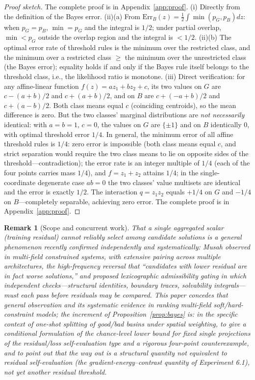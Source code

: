 \documentclass[11pt]{article}
\newtheorem*{remark}{Remark}
\numberwithin{equation}{section}
\begin{document}
\begin{proof}[Proof sketch] The complete proof is in Appendix~\ref{app:proof}.
(i) Directly from the definition of the Bayes error. (ii)(a) From $\mathrm{Err}_B(z)=\tfrac12\int\min(p_G,p_B)dz$: when $p_G=p_B$, $\min=p_G$ and the integral is $1/2$; under partial overlap, $\min<p_G$ outside the overlap region and the integral is $<1/2$. (ii)(b) The optimal error rate of threshold rules is the minimum over the restricted class, and the minimum over a restricted class $\ge$ the minimum over the unrestricted class (the Bayes error); equality holds if and only if the Bayes rule itself belongs to the threshold class, i.e., the likelihood ratio is monotone. (iii) Direct verification: for any affine-linear function $f(z)=az_1+bz_2+c$, its two values on $G$ are $c-(a+b)/2$ and $c+(a+b)/2$, and on $B$ are $c+(-a+b)/2$ and $c+(a-b)/2$. Both class means equal $c$ (coinciding centroids), so the mean difference is zero. But the two classes' marginal distributions are \emph{not necessarily} identical: with $a=b=1$, $c=0$, the values on $G$ are $\{\pm1\}$ and on $B$ identically $0$, with optimal threshold error $1/4$. In general, the minimum error of all affine threshold rules is $1/4$: zero error is impossible (both class means equal $c$, and strict separation would require the two class means to lie on opposite sides of the threshold---contradiction); the error rate is an integer multiple of $1/4$ (each of the four points carries mass $1/4$), and $f=z_1+z_2$ attains $1/4$; in the single-coordinate degenerate case $ab=0$ the two classes' value multisets are identical and the error is exactly $1/2$. The interaction $q=z_1z_2$ equals $+1/4$ on $G$ and $-1/4$ on $B$---completely separable, achieving zero error. The complete proof is in Appendix~\ref{app:proof}.
\end{proof}

\begin{remark}[Scope and concurrent work]\label{rem:musah}
That a single aggregated scalar (training residual) cannot reliably select among candidate solutions is a general phenomenon recently confirmed independently and systematically: Musah \cite{Musah2026} observed in multi-field constrained systems, with extensive pairing across multiple architectures, the high-frequency reversal that ``candidates with lower residual are in fact worse solutions,'' and proposed lexicographic admissibility gating in which independent checks---structural identities, boundary traces, solvability integrals---must each pass before residuals may be compared. This paper \emph{concedes} that general observation and its systematic evidence in ranking multi-field soft/hard-constraint models; the increment of Proposition~\ref{prop:bayes} is: in the specific context of \emph{one-shot splitting of good/bad basins under spatial weighting}, to give a conditional formulation of the chance-level lower bound for fixed single projections of the residual/loss self-evaluation type and a rigorous four-point counterexample, and to point out that the way out is a structural quantity not equivalent to residual self-evaluation (the gradient-energy--contrast quantity of Experiment 6.1), not yet another residual threshold.
\end{remark}
\end{document}
